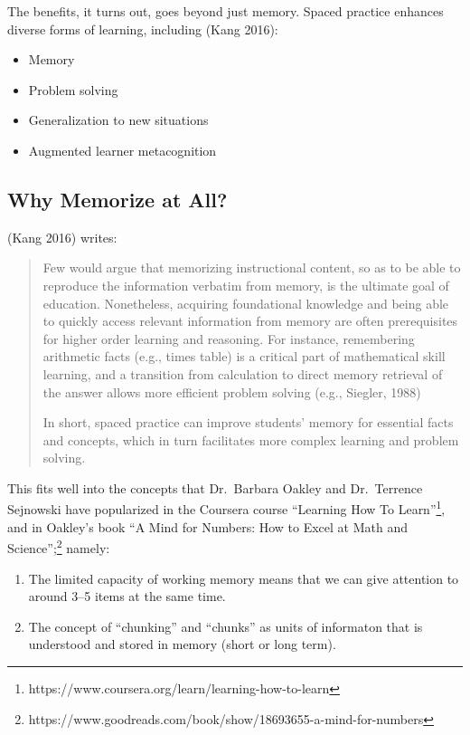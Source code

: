 The benefits, it turns out, goes beyond just memory. Spaced practice
enhances diverse forms of learning, including (Kang 2016):

\begin{itemize}
\tightlist
\item
  Memory
\item
  Problem solving
\item
  Generalization to new situations
\item
  Augmented learner metacognition
\end{itemize}

\subsection{Why Memorize at All?}\label{why-memorize-at-all}

(Kang 2016) writes:

\begin{quote}
Few would argue that memorizing instructional content, so as to be able
to reproduce the information verbatim from memory, is the ultimate goal
of education. Nonetheless, acquiring foundational knowledge and being
able to quickly access relevant information from memory are often
prerequisites for higher order learning and reasoning. For instance,
remembering arithmetic facts (e.g., times table) is a critical part of
mathematical skill learning, and a transition from calculation to direct
memory retrieval of the answer allows more efficient problem solving
(e.g., Siegler, 1988)

In short, spaced practice can improve students' memory for essential
facts and concepts, which in turn facilitates more complex learning and
problem solving.
\end{quote}

This fits well into the concepts that Dr.~Barbara Oakley and
Dr.~Terrence Sejnowski have popularized in the Coursera course
``Learning How To Learn''\footnote{https://www.coursera.org/learn/learning-how-to-learn},
and in Oakley's book ``A Mind for Numbers: How to Excel at Math and
Science'';\footnote{https://www.goodreads.com/book/show/18693655-a-mind-for-numbers}
namely:

\begin{enumerate}
\def\labelenumi{\arabic{enumi}.}
\tightlist
\item
  The limited capacity of working memory means that we can give
  attention to around 3--5 items at the same time.
\item
  The concept of ``chunking'' and ``chunks'' as units of informaton that
  is understood and stored in memory (short or long term).
\end{enumerate}

